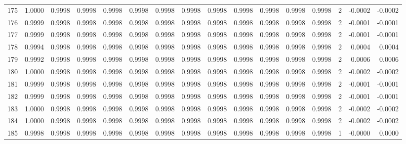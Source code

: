 \begin{tabular}{lrrrrrrrrrrrrrrr}
175 &      1.0000 &  0.9998 &  0.9998 &  0.9998 &  0.9998 &  0.9998 &  0.9998 &  0.9998 &  0.9998 &  0.9998 &   0.9998 &     0.9998 &      2 &                   -0.0002 &                    -0.0002 \\
176 &      0.9999 &  0.9998 &  0.9998 &  0.9998 &  0.9998 &  0.9998 &  0.9998 &  0.9998 &  0.9998 &  0.9998 &   0.9998 &     0.9998 &      2 &                   -0.0001 &                    -0.0001 \\
177 &      0.9999 &  0.9998 &  0.9998 &  0.9998 &  0.9998 &  0.9998 &  0.9998 &  0.9998 &  0.9998 &  0.9998 &   0.9998 &     0.9998 &      2 &                   -0.0001 &                    -0.0001 \\
178 &      0.9994 &  0.9998 &  0.9998 &  0.9998 &  0.9998 &  0.9998 &  0.9998 &  0.9998 &  0.9998 &  0.9998 &   0.9998 &     0.9998 &      2 &                    0.0004 &                     0.0004 \\
179 &      0.9992 &  0.9998 &  0.9998 &  0.9998 &  0.9998 &  0.9998 &  0.9998 &  0.9998 &  0.9998 &  0.9998 &   0.9998 &     0.9998 &      2 &                    0.0006 &                     0.0006 \\
180 &      1.0000 &  0.9998 &  0.9998 &  0.9998 &  0.9998 &  0.9998 &  0.9998 &  0.9998 &  0.9998 &  0.9998 &   0.9998 &     0.9998 &      2 &                   -0.0002 &                    -0.0002 \\
181 &      0.9999 &  0.9998 &  0.9998 &  0.9998 &  0.9998 &  0.9998 &  0.9998 &  0.9998 &  0.9998 &  0.9998 &   0.9998 &     0.9998 &      2 &                   -0.0001 &                    -0.0001 \\
182 &      0.9999 &  0.9998 &  0.9998 &  0.9998 &  0.9998 &  0.9998 &  0.9998 &  0.9998 &  0.9998 &  0.9998 &   0.9998 &     0.9998 &      2 &                   -0.0001 &                    -0.0001 \\
183 &      1.0000 &  0.9998 &  0.9998 &  0.9998 &  0.9998 &  0.9998 &  0.9998 &  0.9998 &  0.9998 &  0.9998 &   0.9998 &     0.9998 &      2 &                   -0.0002 &                    -0.0002 \\
184 &      1.0000 &  0.9998 &  0.9998 &  0.9998 &  0.9998 &  0.9998 &  0.9998 &  0.9998 &  0.9998 &  0.9998 &   0.9998 &     0.9998 &      2 &                   -0.0002 &                    -0.0002 \\
185 &      0.9998 &  0.9998 &  0.9998 &  0.9998 &  0.9998 &  0.9998 &  0.9998 &  0.9998 &  0.9998 &  0.9998 &   0.9998 &     0.9998 &      1 &                   -0.0000 &                     0.0000 \\

\end{tabular}

